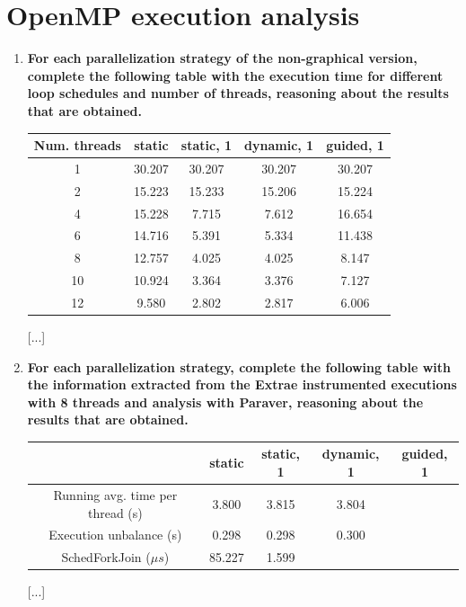 \documentclass[a4paper,11pt]{article}
\begin{document}
\section{OpenMP execution analysis}
\begin{enumerate}
\setcounter{enumi}{0}
\item
\textbf{For each parallelization strategy of the non-graphical version, complete the following table with
    the execution time for different loop schedules and number of threads, reasoning about the results
    that are obtained.}
\begin{center}
\begin{tabular}{| c || c | c | c | c |}
\hline
\textbf{Num. threads} & \textbf{static} & \textbf{static, 1} & \textbf{dynamic, 1} & \textbf{guided, 1}
\\
\hline
\hline
1 & 30.207 & 30.207 & 30.207 & 30.207
\\
\hline
2 & 15.223 & 15.233 & 15.206 & 15.224
\\
\hline
4 & 15.228 & 7.715 & 7.612 & 16.654
\\
\hline
6 & 14.716 & 5.391 & 5.334 & 11.438
\\
\hline
8 & 12.757 & 4.025 & 4.025 & 8.147
\\
\hline
10 & 10.924 & 3.364 & 3.376 & 7.127
\\
\hline
12 & 9.580 & 2.802 & 2.817 & 6.006
\\
\hline
\end{tabular}
\end{center}
[...]
\setcounter{enumi}{1}
\item
\textbf{For each parallelization strategy, complete the following table with the information extracted from
    the Extrae instrumented executions with 8 threads and analysis with Paraver, reasoning about the
    results that are obtained.}
\begin{center}
\begin{tabular}{| c || c | c | c | c |}
\hline
\textbf{} & \textbf{static} & \textbf{static, 1} & \textbf{dynamic, 1} & \textbf{guided, 1}
\\
\hline
\hline
Running avg. time per thread (s) & 3.800 & 3.815 & 3.804
\\
\hline
Execution unbalance (s) & 0.298 & 0.298 & 0.300
\\
\hline
SchedForkJoin ($\mu s$) & 85.227 & 1.599 &  & 
\\
\hline
\end{tabular}
\end{center}
[...]
\end{enumerate}
\end{document}
